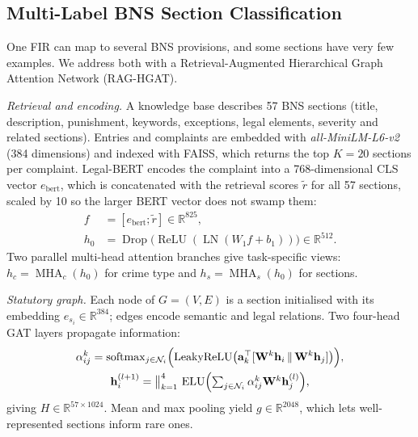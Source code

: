 \documentclass[conference]{IEEEtran}
\begin{document}
\subsection{Multi-Label BNS Section Classification}
\label{subsec:bns}

One FIR can map to several BNS provisions, and some sections have very few examples. We address both with a Retrieval-Augmented Hierarchical Graph Attention Network (RAG-HGAT).

\textit{Retrieval and encoding.} A knowledge base describes 57 BNS sections (title, description, punishment, keywords, exceptions, legal elements, severity and related sections). Entries and complaints are embedded with \textit{all-MiniLM-L6-v2} (384 dimensions) and indexed with FAISS, which returns the top $K=20$ sections per complaint. Legal-BERT encodes the complaint into a 768-dimensional CLS vector $e_{\text{bert}}$, which is concatenated with the retrieval scores $\tilde r$ for all 57 sections, scaled by 10 so the larger BERT vector does not swamp them:
\begin{equation}
\begin{aligned}
f&=[e_{\text{bert}};\tilde r]\in\mathbb{R}^{825},\\
h_0&=\operatorname{Drop}\bigl(\operatorname{ReLU}(\operatorname{LN}(W_1f+b_1))\bigr)\in\mathbb{R}^{512}.
\end{aligned}
\label{eq:fusion}
\end{equation}
Two parallel multi-head attention branches give task-specific views: $h_c=\operatorname{MHA}_c(h_0)$ for crime type and $h_s=\operatorname{MHA}_s(h_0)$ for sections.

\textit{Statutory graph.} Each node of $G=(V,E)$ is a section initialised with its embedding $e_{s_i}\in\mathbb{R}^{384}$; edges encode semantic and legal relations. Two four-head GAT layers propagate information:
\begin{gather}
\alpha_{ij}^{k}=\operatorname{softmax}_{j\in\mathcal{N}_i}\Bigl(\operatorname{LeakyReLU}\bigl(\mathbf a_k^{\top}[\mathbf W^{k}\mathbf h_i\,\|\,\mathbf W^{k}\mathbf h_j]\bigr)\Bigr),\label{eq:gat_att}\\
\mathbf h_i^{(l+1)}=\big\Vert_{k=1}^{4}\,\operatorname{ELU}\Bigl(\textstyle\sum_{j\in\mathcal N_i}\alpha_{ij}^{k}\mathbf W^{k}\mathbf h_j^{(l)}\Bigr),\label{eq:gat}
\end{gather}
giving $H\in\mathbb{R}^{57\times1024}$. Mean and max pooling yield $g\in\mathbb{R}^{2048}$, which lets well-represented sections inform rare ones.
\end{document}
